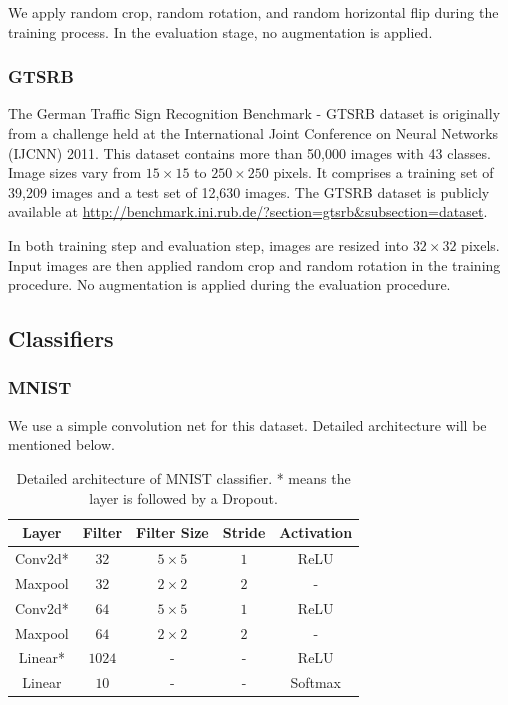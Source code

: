 \documentclass{article}
\begin{document}
We apply random crop, random rotation, and random horizontal flip during the training process. In the evaluation stage, no augmentation is applied. 
\subsubsection{GTSRB}
The German Traffic Sign Recognition Benchmark - GTSRB \cite{stallkamp2012man} dataset is originally from a challenge held at the International Joint Conference on Neural Networks (IJCNN) 2011. This dataset contains more than 50,000 images with 43 classes. Image sizes vary from $15 \times 15$ to $250 \times 250$ pixels. It comprises a training set of 39,209 images and a test set of 12,630 images. The GTSRB dataset is publicly available at \url{http://benchmark.ini.rub.de/?section=gtsrb&subsection=dataset}.

In both training step and evaluation step, images are resized into $32 \times 32$ pixels. Input images are then applied random crop and random rotation in the training procedure. No augmentation is applied during the evaluation procedure. 

\subsection{Classifiers}
\subsubsection{MNIST}
We use a simple convolution net for this dataset. Detailed architecture will be mentioned below. 
\begin{table}[t]
\caption{Detailed architecture of MNIST classifier. * means the layer is followed by a Dropout.}
\label{tab: mnist classifier architecture}
\centering
    \begin{tabu} to \textwidth {ccccc}
    \toprule
    Layer & Filter & Filter Size & Stride & Activation \\
    \midrule
    Conv2d* & $32$ & $5 \times 5$ & $1$ & ReLU \\
    Maxpool & $32$ & $2 \times 2$ & $2$ & - \\
    Conv2d* & $64$ & $5 \times 5$ & $1$ & ReLU \\
    Maxpool & $64$ & $2 \times 2$ & $2$ & - \\
    Linear*  & $1024$ & - & - & ReLU \\
    Linear & $10$ & - & - & Softmax \\
    \bottomrule
    \end{tabu}
\end{table}
\end{document}
